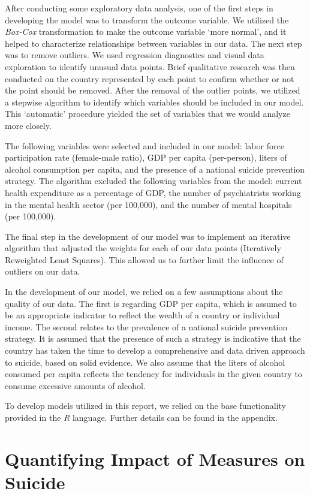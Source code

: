 \documentclass[]{article}
\begin{document}
After conducting some exploratory data analysis, one of the first steps
in developing the model was to transform the outcome variable. We
utilized the \emph{Box-Cox} transformation to make the outcome variable
`more normal', and it helped to characterize relationships between
variables in our data. The next step was to remove outliers. We used
regression diagnostics and visual data exploration to identify unusual
data points. Brief qualitative research was then conducted on the
country represented by each point to confirm whether or not the point
should be removed. After the removal of the outlier points, we utilized
a stepwise algorithm to identify which variables should be included in
our model. This `automatic' procedure yielded the set of variables that
we would analyze more closely.

The following variables were selected and included in our model: labor
force participation rate (female-male ratio), GDP per capita
(per-person), liters of alcohol consumption per capita, and the presence
of a national suicide prevention strategy. The algorithm excluded the
following variables from the model: current health expenditure as a
percentage of GDP, the number of psychiatrists working in the mental
health sector (per 100,000), and the number of mental hospitals (per
100,000).

The final step in the development of our model was to implement an
iterative algorithm that adjusted the weights for each of our data
points (Iteratively Reweighted Least Squares). This allowed us to
further limit the influence of outliers on our data.

In the development of our model, we relied on a few assumptions about
the quality of our data. The first is regarding GDP per capita, which is
assumed to be an appropriate indicator to reflect the wealth of a
country or individual income. The second relates to the prevalence of a
national suicide prevention strategy. It is assumed that the presence of
such a strategy is indicative that the country has taken the time to
develop a comprehensive and data driven approach to suicide, based on
solid evidence. We also assume that the liters of alcohol consumed per
capita reflects the tendency for individuals in the given country to
consume excessive amounts of alcohol.

To develop models utilized in this report, we relied on the base
functionality provided in the \emph{R} language. Further details can be
found in the appendix.

\section{Quantifying Impact of Measures on
Suicide}\label{quantifying-impact-of-measures-on-suicide}
\end{document}
